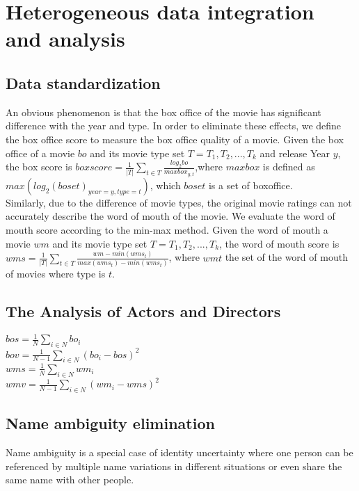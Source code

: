 \section{Heterogeneous data integration and analysis}
\subsection{Data standardization}
An obvious phenomenon is that the box office of the movie has significant difference with the year and type. In order to eliminate these effects, we define the box office score to measure the box office quality of a movie. Given the box office of a movie $bo$ and its movie type set $T = {T_1,T_2,...,T_k}$ and release Year $y$, the box score is $boxscore=\frac{1}{|T|}\sum_{t\in T}\frac{log_2bo}{maxbox_{y,t}}$,where $maxbox$ is defined as $max(log_2(boset)_{year=y,type=t})$, which $boset$ is a set of boxoffice.\\
Similarly, due to the difference of movie types, the original movie ratings can not accurately describe the word of mouth of the movie. We evaluate the word of mouth score according to the min-max method. Given the word of mouth a movie $wm$ and its movie type set $T = {T_1,T_2,...,T_k}$, the word of mouth score is $wms=\frac{1}{|T|}\sum_{t\in T}\frac{wm-min(wms_t)}{max(wms_t)-min(wms_t)}$, where $wmt$ the set of the word of mouth of movies where type is $t$.
\subsection{The Analysis of Actors and Directors}
$bos =  \frac{1}{N}\sum_{i\in N}bo_i$\\
$bov = \frac{1}{N-1}\sum_{i\in N}(bo_i-bos)^2$\\
$wms =  \frac{1}{N}\sum_{i\in N}wm_i$\\
$wmv = \frac{1}{N-1}\sum_{i\in N}(wm_i-wms)^2$\\
\subsection{Name ambiguity elimination}
Name ambiguity is a special case of identity uncertainty where one person can be referenced by multiple name variations in different situations or even share the same name with other people.


